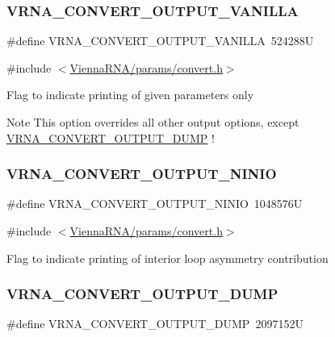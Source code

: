 \subsubsection{\texorpdfstring{VRNA\_CONVERT\_OUTPUT\_VANILLA}{VRNA\_CONVERT\_OUTPUT\_VANILLA}}
{\footnotesize\ttfamily \#define V\+R\+N\+A\+\_\+\+C\+O\+N\+V\+E\+R\+T\+\_\+\+O\+U\+T\+P\+U\+T\+\_\+\+V\+A\+N\+I\+L\+LA~524288U}



{\ttfamily \#include $<$\mbox{\hyperlink{convert_8h}{Vienna\+R\+N\+A/params/convert.\+h}}$>$}

Flag to indicate printing of given parameters only~\newline
\begin{DoxyNote}{Note}
This option overrides all other output options, except \mbox{\hyperlink{group__energy__parameters__convert_gac86976e9c2a55b3a6481ea60044f6098}{V\+R\+N\+A\+\_\+\+C\+O\+N\+V\+E\+R\+T\+\_\+\+O\+U\+T\+P\+U\+T\+\_\+\+D\+U\+MP}} ! 
\end{DoxyNote}
\mbox{\label{group__energy__parameters__convert_ga2eb0462f16939ddacdaf751a88d675ce}} 
\subsubsection{\texorpdfstring{VRNA\_CONVERT\_OUTPUT\_NINIO}{VRNA\_CONVERT\_OUTPUT\_NINIO}}
{\footnotesize\ttfamily \#define V\+R\+N\+A\+\_\+\+C\+O\+N\+V\+E\+R\+T\+\_\+\+O\+U\+T\+P\+U\+T\+\_\+\+N\+I\+N\+IO~1048576U}



{\ttfamily \#include $<$\mbox{\hyperlink{convert_8h}{Vienna\+R\+N\+A/params/convert.\+h}}$>$}

Flag to indicate printing of interior loop asymmetry contribution \mbox{\label{group__energy__parameters__convert_gac86976e9c2a55b3a6481ea60044f6098}} 
\subsubsection{\texorpdfstring{VRNA\_CONVERT\_OUTPUT\_DUMP}{VRNA\_CONVERT\_OUTPUT\_DUMP}}
{\footnotesize\ttfamily \#define V\+R\+N\+A\+\_\+\+C\+O\+N\+V\+E\+R\+T\+\_\+\+O\+U\+T\+P\+U\+T\+\_\+\+D\+U\+MP~2097152U}




